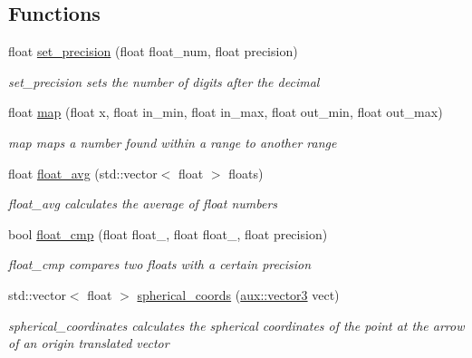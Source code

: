 \subsection*{Functions}
\begin{DoxyCompactItemize}
\item 
float \hyperlink{namespacecloud__object__segmentation_1_1aux_a4b661185614d1037447a89a148a204eb}{set\+\_\+precision} (float float\+\_\+num, float precision)
\begin{DoxyCompactList}\small\item\em set\+\_\+precision sets the number of digits after the decimal \end{DoxyCompactList}\item 
float \hyperlink{namespacecloud__object__segmentation_1_1aux_afdc9858a2a1aa966c6b9cf71a4549718}{map} (float x, float in\+\_\+min, float in\+\_\+max, float out\+\_\+min, float out\+\_\+max)
\begin{DoxyCompactList}\small\item\em map maps a number found within a range to another range \end{DoxyCompactList}\item 
float \hyperlink{namespacecloud__object__segmentation_1_1aux_a16d1866d46bb2c56c66f9d703fa7189e}{float\+\_\+avg} (std\+::vector$<$ float $>$ floats)
\begin{DoxyCompactList}\small\item\em float\+\_\+avg calculates the average of float numbers \end{DoxyCompactList}\item 
bool \hyperlink{namespacecloud__object__segmentation_1_1aux_a6dbc39e59b20bcc59affd0aad8496dc3}{float\+\_\+cmp} (float float\+\_, float float\+\_, float precision)
\begin{DoxyCompactList}\small\item\em float\+\_\+cmp compares two floats with a certain precision \end{DoxyCompactList}\item 
std\+::vector$<$ float $>$ \hyperlink{namespacecloud__object__segmentation_1_1aux_ae659a392c3508e64e4a82bb61ee4cc86}{spherical\+\_\+coords} (\hyperlink{classcloud__object__segmentation_1_1aux_1_1vector3}{aux\+::vector3} vect)
\begin{DoxyCompactList}\small\item\em spherical\+\_\+coordinates calculates the spherical coordinates of the point at the arrow of an origin translated vector \end{DoxyCompactList}\item 

\end{DoxyCompactItemize}
